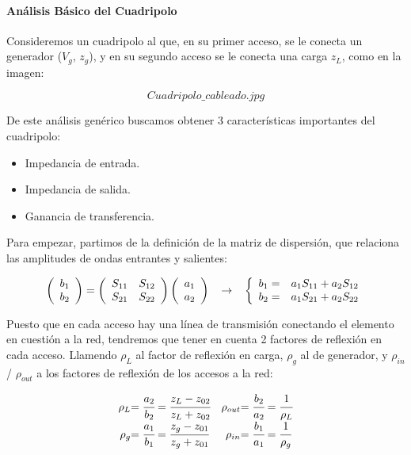 \documentclass[12pt]{article}
\begin{document}
\paragraph{An\'alisis B\'asico del Cuadripolo}

Consideremos un cuadripolo al que, en su primer acceso, se le conecta un generador ($V_g$, $z_g$), y en su segundo acceso se le conecta una carga $z_L$, como en la imagen:

$$Cuadripolo\_cableado.jpg$$

De este an\'alisis gen\'erico buscamos obtener 3 caracter\'isticas importantes del cuadripolo:
\begin{itemize}
	\item Impedancia de entrada.
	\item Impedancia de salida.
	\item Ganancia de transferencia.
\end{itemize}

Para empezar, partimos de la definici\'on de la matriz de dispersi\'on, que relaciona las amplitudes de ondas entrantes y salientes:

$$\left(\begin{array}{c}
	b_1\\
	b_2
\end{array}\right)
=
\left(\begin{array}{cc}
	S_{11} & S_{12}\\
	S_{21} & S_{22}
\end{array}\right)
\left(\begin{array}{c}
	a_1\\
	a_2
\end{array}\right)
\hspace{0.3cm} \rightarrow \hspace{0.3cm}
\left\{\begin{array}{cc}
	b_1 = & a_1 S_{11} + a_2 S_{12}\\
	b_2 = & a_1 S_{21} + a_2 S_{22}
\end{array}\right.
$$

Puesto que en cada acceso hay una l\'inea de transmisi\'on conectando el elemento en cuesti\'on a la red, tendremos que tener en cuenta 2 factores de reflexi\'on en cada acceso. Llamendo $\rho_L$ al factor de reflexi\'on en carga, $\rho_g$ al de generador, y $\rho_{in}$ / $\rho_{out}$ a los factores de reflexi\'on de los accesos a la red:

$$\begin{array}{r@{}lr@{}l}
	\rho_L &=\cfrac{a_2}{b_2} = \cfrac{z_{L}-z_{02}}{z_{L}+z_{02}}& \rho_{out}&= \cfrac{b_2}{a_2} = \cfrac{1}{\rho_L}\\
	\rho_g &=\cfrac{a_1}{b_1} = \cfrac{z_{g}-z_{01}}{z_{g}+z_{01}}& \rho_{in} &= \cfrac{b_1}{a_1} = \cfrac{1}{\rho_g}
\end{array}$$
\end{document}
